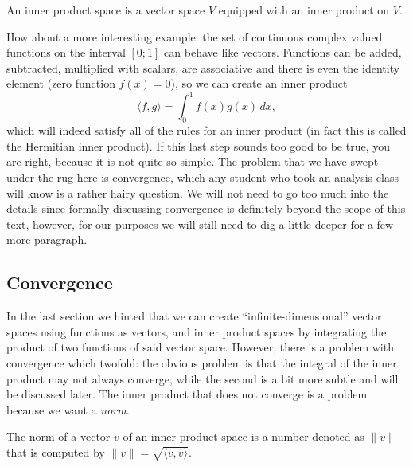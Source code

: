 \begin{definition}
  \nocite{axler_linear_2014}
  An inner product space is a vector space \(V\) equipped with an inner
  product on \(V\).
\end{definition}

How about a more interesting example: the set of continuous complex valued
functions on the interval \([0; 1]\) can behave like vectors.  Functions can
be added, subtracted, multiplied with scalars, are associative and there is
even the identity element (zero function \(f(x) = 0\)), so we can create an
inner product
\[
  \langle f, g \rangle = \int_0^1 f(x) \overline{g(x)} \, dx,
\]
which will indeed satisfy all of the rules for an inner product (in fact this
is called the Hermitian inner product\nocite{allard_mathematics_2009}). If
this last step sounds too good to be true, you are right, because it is not
quite so simple. The problem that we have swept under the rug here is
convergence, which any student who took an analysis class will know is a
rather hairy question. We will not need to go too much into the details since
formally discussing convergence is definitely beyond the scope of this text,
however, for our purposes we will still need to dig a little deeper for a few
more paragraph.

\subsection{Convergence}

In the last section we hinted that we can create ``infinite-dimensional''
vector spaces using functions as vectors, and inner product spaces by
integrating the product of two functions of said vector space. However, there
is a problem with convergence which twofold: the obvious problem is that the
integral of the inner product may not always converge, while the second is a
bit more subtle and will be discussed later. The inner product that does
not converge is a problem because we want a \emph{norm}.

\begin{definition}[\(L^2\) Norm]
  \nocite{axler_linear_2014}
  The norm of a vector \(v\) of an inner product space is a number
  denoted as \(\| v \|\) that is computed by \(\| v \| = \sqrt{\langle v, v
  \rangle}\).
\end{definition}

